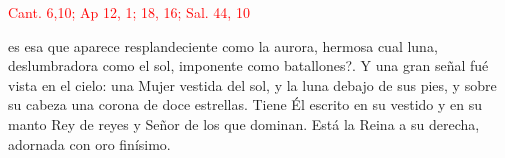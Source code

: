 \hfill\textcolor{red}{Cant. 6,10; Ap 12, 1; 18, 16; Sal. 44, 10}

es esa que aparece resplandeciente como la aurora, hermosa cual luna, deslumbradora como el sol, imponente como batallones?.
Y una gran señal fué vista en el cielo: una Mujer vestida del sol, y la luna debajo de sus  pies, y sobre su cabeza una corona de doce estrellas.
Tiene Él escrito en su vestido y en su manto Rey de reyes y Señor de los que dominan. Está la Reina a su derecha, adornada con oro finísimo.